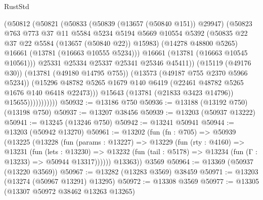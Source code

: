 \begin{lexlean}{RustStd}
\begin{coremodule}
                            (@50812
                              (@50821
                                (@50833
                                  (@50839 (@13657 (@50840 @151)) @29947)
                                  (@50823
                                    @763
                                    @773
                                    @37
                                    @11
                                    @5584
                                    @5234
                                    @5194
                                    @5669
                                    @10554
                                    @5392
                                    (@50835 @22 @37 @22 @5584 (@13657 (@50840 @22)) @15983)
                                    (@14278 @48800 @5265)
                                    @16661
                                    (@13781 (@16663 @10555 @5234)))
                                  @16661
                                  (@13781 (@16663 @10545 @10561)))
                                @25331
                                @25334
                                @25337
                                @25341
                                @25346
                                @45411))
                            (@15119 (@49176 @30))
                            (@13781 (@49180 @14795 @755))
                            (@13573 (@49187 @755 @2370 @5966 @5234))
                            (@15296
                              @48782
                              @5265
                              @1679
                              @140
                              @6419
                              (@22461 @48782 @5265 @1676 @140 @6418 @22473)))
                          @15643
                          (@13781 (@21833 @3423 @14796))
                          @15655)))))))))))
@50932 := @13186 @750
@50936 := @13188 (@13192 @750) (@13198 @750)
@50937 := @13207 @38456
@50939 := @13203 (@50937 @13222)
@50941 := @13245 (@13246 @750)
@50942 := @13241 @50941
@50944 := @13203 (@50942 @13270)
@50961 := @13202
    (fun (fn : @705) =>
    @50939
      (@13225
        (@13228
          (fun (params : @13227) =>
          @13229
            (fun (rty : @4160) =>
            @13231
              (fun (lets : @13230) =>
              @13232 (fun (tail : @5178) => @13234 (fun (Γ : @13233) => @50944 @13317))))))
        @13363))
    @3569
@50964 := @13369 (@50937 (@13220 @3569))
@50967 := @13282 (@13283 @3569) @38459
@50971 := @13203 (@13274 (@50967 @13291) @13295)
@50972 := @13308 @3569
@50977 := @13305 (@13307 @50972 @38462 @13263 @13265)

\end{coremodule}
\end{lexlean}
